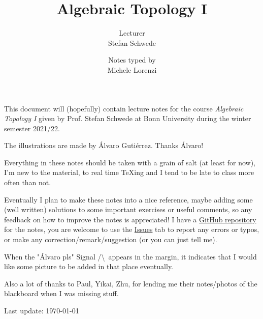 \documentclass[a4paper, 10pt, oneside, DIV=9, chapterprefix=true, numbers=enddot,bibliography=totoc]{scrbook}
\title{Algebraic Topology I}
\author{{\normalsize Lecturer}\\
	Stefan Schwede}
\date{{\normalsize Notes typed by}\\
	Michele Lorenzi}
\begin{document}
\setlength{\parindent}{0pt}
\setlength{\parskip}{4pt}

\frontmatter
{}
\renewcommand{\thedummy}{\arabic{dummy}}
\maketitle
This document will (hopefully) contain lecture notes for the course \emph{Algebraic Topology I} given by Prof. Stefan Schwede at Bonn University during the winter semester 2021/22.

The illustrations are made by \'Alvaro Guti\'errez. Thanks \'Alvaro!

Everything in these notes should be taken with a grain of salt (at least for now), I'm new to the material, to real time \TeX ing and I tend to be late to class more often than not.

Eventually I plan to make these notes into a nice reference, maybe adding some (well written) solutions to some important exercises or useful comments, so any feedback on how to improve the notes is appreciated! I have a \href{https://github.com/lrnmhl/AT1}{GitHub repository} for the notes, you are welcome to use the \href{https://github.com/lrnmhl/AT1/issues}{Issues} tab to report any errors or typos, or make any correction/remark/suggestion (or you can just tell me).

When the "\'Alvaro pls" Signal /\textbackslash\ appears in the margin, it indicates that I would like some picture to be added in that place eventually.

Also a lot of thanks to Paul, Yikai, Zhu, for lending me their notes/photos of the blackboard when I was missing stuff.

\hrulefill

Last update: \today
	
	
	
\tableofcontents
{}
\setcounter{llecture}{0}
\mainmatter{}
\renewcommand{\thedummy}{\thechapter.\arabic{dummy}}
\renewcommand{\thechapter}{\arabic{chapter}}
























\nocite{*}


\backmatter{}
\printbibliography[heading=bibintoc, title={References}]
\end{document}
